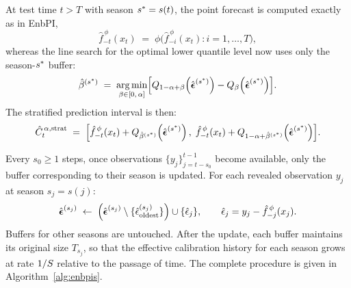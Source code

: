 At test time $t > T$ with season $s^* = s(t)$, the point forecast
is computed exactly as in EnbPI,
\[
  \hat{f}_{-t}^{\,\phi}(x_t)
  \;=\;
  \phi\!\bigl(\hat{f}_{-i}^{\,\phi}(x_t) : i = 1,\ldots,T\bigr),
\]
whereas the line search for the optimal lower quantile level now uses
only the season-$s^*$ buffer:
\begin{equation}
  \label{eq:betahat_strat}
  \hat{\beta}^{(s^*)}
  \;=\;
  \operatorname*{arg\,min}_{\beta \in [0,\,\alpha]}
  \Bigl[
    Q_{1-\alpha+\beta}\!\left(\hat{\boldsymbol\epsilon}^{(s^*)}\right)
    -
    Q_{\beta}\!\left(\hat{\boldsymbol\epsilon}^{(s^*)}\right)
  \Bigr].
\end{equation}
The stratified prediction interval is then:
\begin{equation}
  \label{eq:enbpis_interval}
  \hat{C}_t^{\,\alpha,\textup{strat}}
  \;=\;
  \Bigl[
    \hat{f}_{-t}^{\,\phi}(x_t)
    + Q_{\hat{\beta}^{(s^*)}}\!\left(\hat{\boldsymbol\epsilon}^{(s^*)}\right),\;
    \hat{f}_{-t}^{\,\phi}(x_t)
    + Q_{1-\alpha+\hat{\beta}^{(s^*)}}\!\left(\hat{\boldsymbol\epsilon}^{(s^*)}\right)
  \Bigr].
\end{equation}

Every $s_0 \geq 1$ steps, once observations $\{y_j\}_{j=t-s_0}^{t-1}$
become available, only the buffer corresponding to their season is
updated.  For each revealed observation $y_j$ at season
$s_j = s(j)$:
\begin{equation}
  \label{eq:slide_strat}
  \hat{\boldsymbol\epsilon}^{(s_j)}
  \;\leftarrow\;
  \Bigl(
    \hat{\boldsymbol\epsilon}^{(s_j)}
    \setminus
    \{\hat{\epsilon}_{\text{oldest}}^{(s_j)}\}
  \Bigr)
  \cup
  \{\hat{\epsilon}_j\},
  \qquad
  \hat{\epsilon}_j = y_j - \hat{f}_{-j}^{\,\phi}(x_j).
\end{equation}
Buffers for other seasons are untouched.  After the update, each
buffer maintains its original size $T_{s_j}$, so that the effective
calibration history for each season grows at rate $1/S$ relative
to the passage of time.  The complete procedure is given in
Algorithm~\ref{alg:enbpis}.

